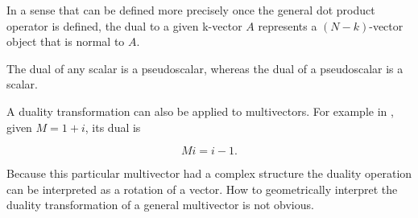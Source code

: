 In a sense that can be defined more precisely once the general dot product operator is defined, the dual to a given k-vector \( A \) represents a \((N-k)\)-vector object that is normal to \( A \).

The dual of any scalar is a pseudoscalar, whereas the dual of a pseudoscalar is a scalar.

A duality transformation can also be applied to multivectors.
For example in , given \( M = 1 + i\), its dual is

\begin{dmath}\label{eqn:dual:460}
M i = i - 1.
\end{dmath}

Because this particular multivector had a complex structure the duality operation can be interpreted as a rotation of a vector.
How to geometrically interpret the duality transformation of a general multivector is not obvious.

